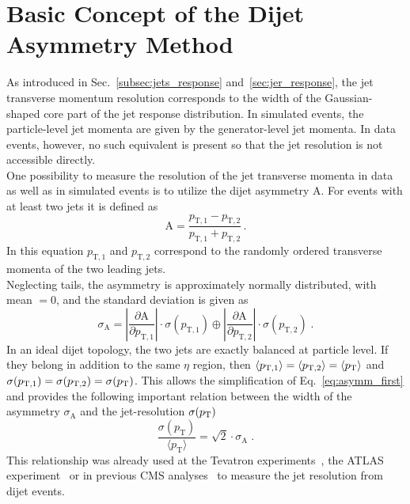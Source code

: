 \section{Basic Concept of the Dijet Asymmetry Method}
\label{sec:jer_method}
As introduced in Sec.~\ref{subsec:jets_response} and~\ref{sec:jer_response}, the jet transverse momentum resolution corresponds to the width of the Gaussian-shaped core part of the jet response distribution. In simulated events, the particle-level jet momenta are given by the generator-level jet momenta. In data events, however, no such equivalent is present so that the jet resolution is not accessible directly. \\
One possibility to measure the resolution of the jet transverse momenta in data as well as in simulated events is to utilize the dijet asymmetry $\mathrm{A}$. For events with at least two jets it is defined as
\begin{equation}
\label{eq:asymmdef}
  \mathrm{A} = \frac{p_\mathrm{T,1} - p_\mathrm{T,2}}{p_\mathrm{T,1} + p_\mathrm{T,2}} \, .
 \end{equation}
 In this equation $p_\mathrm{T,1}$ and $p_\mathrm{T,2}$ correspond to the randomly ordered transverse momenta of the two leading jets. \\
 Neglecting tails, the asymmetry is approximately normally distributed, with mean $= 0$, and the standard deviation is given as
 \begin{equation}
 \label{eq:asymm_first}
  {\sigma_{\mathrm{A}}} = \left\lvert \frac{\partial \mathrm{A}}{\partial p_\mathrm{T,1}} \right\rvert \cdot \sigma(p_\mathrm{T,1}) \oplus  \left\lvert \frac{\partial \mathrm{A}}{\partial p_\mathrm{T,2}} \right\rvert \cdot \sigma(p_\mathrm{T,2}) \; .
 \end{equation}
 In an ideal dijet topology, the two jets are exactly balanced at particle level. If they belong in addition to the same $\eta$ region, then $\langle p_\mathrm{T,1} \rangle = \langle p_\mathrm{T,2} \rangle = \langle p_{\text{T}} \rangle$ and $\sigma (p_\mathrm{T,1}) = \sigma (p_\mathrm{T,2}) = \sigma (p_{\text{T}})$. This allows the simplification of Eq.~\ref{eq:asymm_first} and provides the following important relation between the width of the asymmetry $\sigma_\mathrm{A}$ and the jet-\pt resolution $\sigma (p_{\text{T}})$
 \begin{equation}
 \label{eq:asymm}
  \frac{\sigma (p_\mathrm{T})}{\langle p_\mathrm{T} \rangle} = \sqrt{2} \cdot \sigma_\mathrm{A} \; .
 \end{equation}
This relationship was already used at the Tevatron experiments~\cite{oai:arXiv.org:hep-ex/0012046, JetsD0}, the ATLAS experiment~\cite{Aad:2012ag} or in previous CMS analyses~\cite{1748-0221-6-11-P11002, thesis:Schroeder} to measure the jet resolution from dijet events. 

